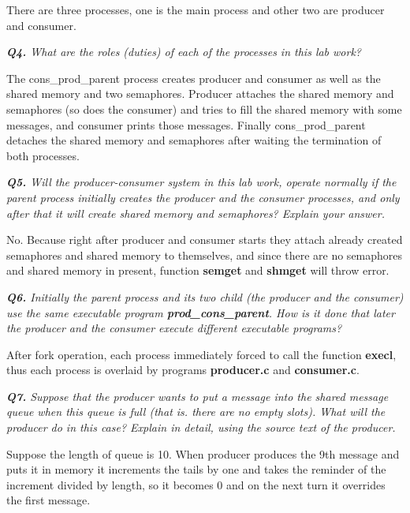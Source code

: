 \documentclass[11pt]{article}
\begin{document}
There are three processes, one is the main process and other two are producer and consumer.

\vspace{5mm}
\textit{\textbf{Q4.} What are the roles (duties) of each of the processes in this lab work?}
\vspace{5mm}

The cons\_prod\_parent process creates producer and consumer as well as the shared memory and two semaphores. Producer attaches the shared memory and semaphores (so does the consumer) and tries to fill the shared memory with some messages, and consumer prints those messages. Finally cons\_prod\_parent detaches the shared memory and semaphores after waiting the termination of both processes.

\vspace{5mm}
\textit{\textbf{Q5.} Will the producer-consumer system in this lab work, operate normally if the parent process initially creates the producer and the consumer processes, and only after that it will create shared memory and semaphores? Explain your answer.}
\vspace{5mm}

No. Because right after producer and consumer starts they attach already created semaphores and shared memory to themselves, and since there are no semaphores and shared memory in present, function \textbf{semget} and \textbf{shmget} will throw error.

\vspace{5mm}
\textit{\textbf{Q6.} Initially the parent process and its two child (the producer and the consumer) use the same executable program \textbf{prod\_cons\_parent}. How is it done that later the producer and the consumer execute different executable programs?}
\vspace{5mm}

After fork operation, each process immediately forced to call the function \textbf{execl}, thus each process is overlaid by programs \textbf{producer.c} and \textbf{consumer.c}.


\vspace{5mm}
\textit{\textbf{Q7.} Suppose that the producer wants to put a message into the shared message queue when this queue is full (that is. there are no empty slots). What will the producer do in this case? Explain in detail, using the source text of the producer.}
\vspace{5mm}

Suppose the length of queue is 10. When producer produces the 9th message and puts it in memory it increments the tails by one and takes the reminder of the increment divided by length, so it becomes 0 and on the next turn it overrides the first message.
\end{document}
